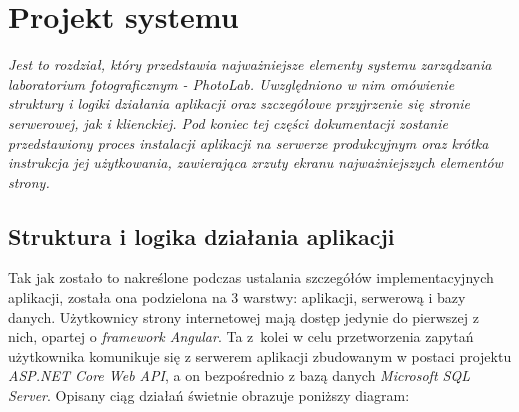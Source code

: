 \chapter{Projekt systemu}
{\em \quad Jest to rozdział, który przedstawia najważniejsze elementy systemu zarządzania laboratorium fotograficznym - \textit{PhotoLab}. Uwzględniono w nim omówienie struktury i logiki działania aplikacji oraz szczegółowe przyjrzenie się stronie serwerowej, jak i klienckiej. Pod koniec tej części dokumentacji zostanie przedstawiony proces instalacji aplikacji na serwerze produkcyjnym oraz krótka instrukcja jej użytkowania, zawierająca zrzuty ekranu najważniejszych elementów strony.}

\section{Struktura i logika działania aplikacji}
	
	\quad Tak jak zostało to nakreślone podczas ustalania szczegółów implementacyjnych aplikacji, została ona podzielona na 3 warstwy: aplikacji, serwerową i bazy danych. Użytkownicy strony internetowej mają dostęp jedynie do pierwszej z nich, opartej o \textit{framework Angular}. Ta z~kolei w celu przetworzenia zapytań użytkownika komunikuje się z serwerem aplikacji zbudowanym w postaci projektu \textit{ASP.NET Core Web API}, a on bezpośrednio z bazą danych \textit{Microsoft SQL Server}. Opisany ciąg działań świetnie obrazuje poniższy diagram:
	
